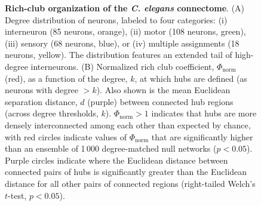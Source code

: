 \documentclass[10pt,letterpaper]{article}
\begin{document}


\begin{figure}[h]
   \centering
 \caption{\textbf{Rich-club organization of the \emph{C. elegans} connectome}.
(A) Degree distribution of neurons, labeled to four categories:
(i) interneuron (85 neurons, orange),
(ii) motor (108 neurons, green),
(iii) sensory (68 neurons, blue), or
(iv) multiple assignments (18 neurons, yellow).
The distribution features an extended tail of high-degree interneurons.
(B)
Normalized rich club coefficient, $\Phi_\mathrm{norm}$ (red), as a function of the degree, $k$, at which hubs are defined (as neurons with degree $>k$).
Also shown is the mean Euclidean separation distance, $d$ (purple) between connected hub regions (across degree thresholds, $k$).
$\Phi_\mathrm{norm} > 1$ indicates that hubs are more densely interconnected among each other than expected by chance, with red circles indicate values of $\Phi_\mathrm{norm}$ that are significantly higher than an ensemble of 1\,000 degree-matched null networks ($p < 0.05$).
Purple circles indicate where the Euclidean distance between connected pairs of hubs is significantly greater than the Euclidean distance for all other pairs of connected regions (right-tailed Welch's $t$-test, $p < 0.05$).
}
 \label{fig:Fig5}
 \end{figure}
\end{document}
